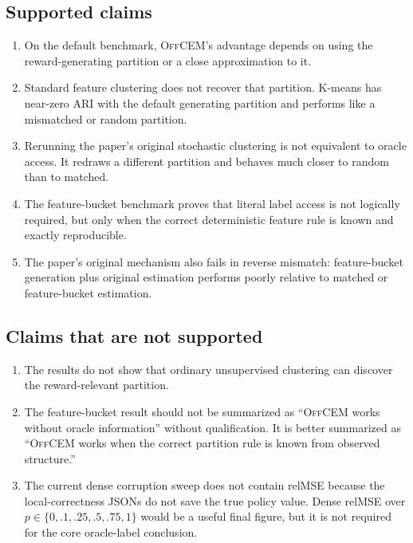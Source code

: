 \documentclass[11pt]{article}
\newcommand{\OffCEM}{\textsc{OffCEM}}
\begin{document}
\subsection{Supported claims}

\begin{enumerate}
    \item On the default benchmark, \OffCEM{}'s advantage depends on using the
    reward-generating partition or a close approximation to it.
    \item Standard feature clustering does not recover that partition. K-means
    has near-zero ARI with the default generating partition and performs like a
    mismatched or random partition.
    \item Rerunning the paper's original stochastic clustering is not equivalent
    to oracle access. It redraws a different partition and behaves much closer
    to random than to matched.
    \item The feature-bucket benchmark proves that literal label access is not
    logically required, but only when the correct deterministic feature rule is
    known and exactly reproducible.
    \item The paper's original mechanism also fails in reverse mismatch:
    feature-bucket generation plus original estimation performs poorly relative
    to matched or feature-bucket estimation.
\end{enumerate}

\subsection{Claims that are not supported}

\begin{enumerate}
    \item The results do not show that ordinary unsupervised clustering can
    discover the reward-relevant partition.
    \item The feature-bucket result should not be summarized as ``\OffCEM{}
    works without oracle information'' without qualification. It is better
    summarized as ``\OffCEM{} works when the correct partition rule is known from
    observed structure.''
    \item The current dense corruption sweep does not contain relMSE because the
    local-correctness JSONs do not save the true policy value. Dense relMSE over
    $p \in \{0,.1,.25,.5,.75,1\}$ would be a useful final figure, but it is not
    required for the core oracle-label conclusion.
\end{enumerate}
\end{document}
